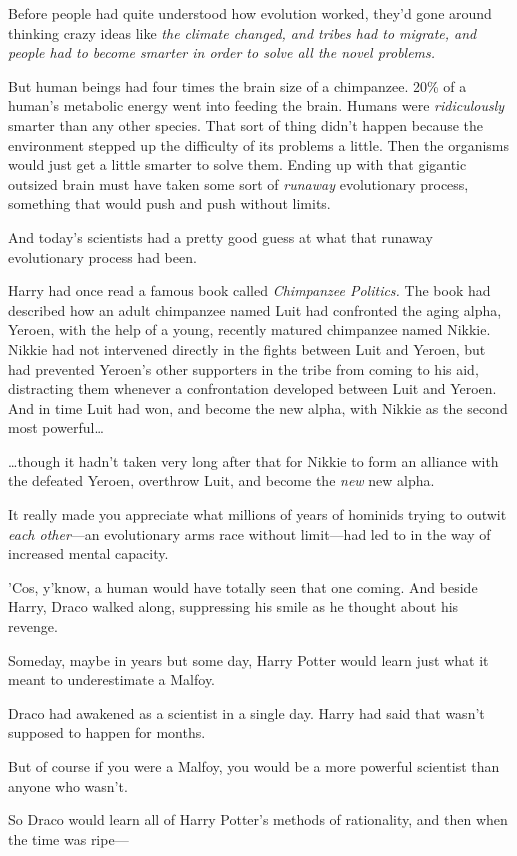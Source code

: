 Before people had quite understood how evolution worked, they'd gone around
thinking crazy ideas like \emph{the climate changed, and tribes had to migrate,
and people had to become smarter in order to solve all the novel problems.}

But human beings had four times the brain size of a chimpanzee. 20\% of a
human's metabolic energy went into feeding the brain. Humans were
\emph{ridiculously} smarter than any other species. That sort of thing didn't
happen because the environment stepped up the difficulty of its problems a
little. Then the organisms would just get a little smarter to solve them.
Ending up with that gigantic outsized brain must have taken some sort of
\emph{runaway} evolutionary process, something that would push and push without
limits.

And today's scientists had a pretty good guess at what that runaway
evolutionary process had been.

Harry had once read a famous book called \emph{Chimpanzee Politics.} The book
had described how an adult chimpanzee named Luit had confronted the aging
alpha, Yeroen, with the help of a young, recently matured chimpanzee named
Nikkie. Nikkie had not intervened directly in the fights between Luit and
Yeroen, but had prevented Yeroen's other supporters in the tribe from coming to
his aid, distracting them whenever a confrontation developed between Luit and
Yeroen. And in time Luit had won, and become the new alpha, with Nikkie as the
second most powerful{\ldots}

{\ldots}though it hadn't taken very long after that for Nikkie to form an
alliance with the defeated Yeroen, overthrow Luit, and become the \emph{new}
new alpha.

It really made you appreciate what millions of years of hominids trying to
outwit \emph{each other}---an evolutionary arms race without limit---had led to
in the way of increased mental capacity.

'Cos, y'know, a human would have totally seen that one coming.
\later
And beside Harry, Draco walked along, suppressing his smile as he thought about
his revenge.

Someday, maybe in years but some day, Harry Potter would learn just what it
meant to underestimate a Malfoy.

Draco had awakened as a scientist in a single day. Harry had said that wasn't
supposed to happen for months.

But of course if you were a Malfoy, you would be a more powerful scientist than
anyone who wasn't.

So Draco would learn all of Harry Potter's methods of rationality, and then
when the time was ripe---

